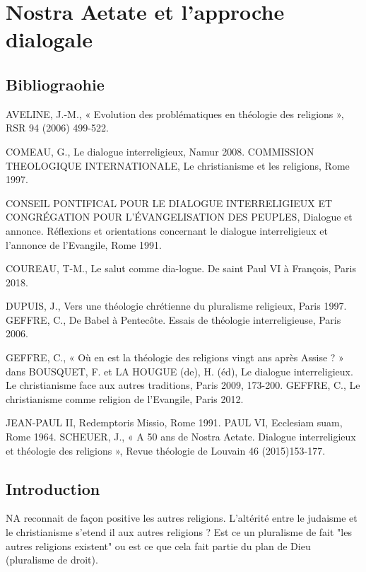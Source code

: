 \chapter{Nostra Aetate et l’approche dialogale}


\section{Bibliograohie}
 AVELINE, J.-M., « Evolution des problématiques en théologie des religions », RSR 94 (2006) 499-522. 
 
 COMEAU, G., Le dialogue interreligieux, Namur 2008. COMMISSION THEOLOGIQUE INTERNATIONALE, Le christianisme et les religions, Rome 1997.
 
 CONSEIL PONTIFICAL POUR LE DIALOGUE INTERRELIGIEUX ET CONGRÉGATION POUR L’ÉVANGELISATION DES PEUPLES, Dialogue et annonce. Réflexions et orientations concernant le dialogue interreligieux et l’annonce de l’Evangile, Rome 1991. 
 
 COUREAU, T-M., Le salut comme dia-logue. De saint Paul VI à François, Paris 2018. 
 
 DUPUIS, J., Vers une théologie chrétienne du pluralisme religieux, Paris 1997. GEFFRE, C., De Babel à Pentecôte. Essais de théologie interreligieuse, Paris 2006. 
 
 GEFFRE, C., « Où en est la théologie des religions vingt ans après Assise ? » dans BOUSQUET, F. et LA HOUGUE (de), H. (éd), Le dialogue interreligieux. Le christianisme face aux autres traditions, Paris 2009, 173-200. GEFFRE, C., Le christianisme comme religion de l’Evangile, Paris 2012. 
 
 JEAN-PAUL II, Redemptoris Missio, Rome 1991. PAUL VI, Ecclesiam suam, Rome 1964. SCHEUER, J., « A 50 ans de Nostra Aetate. Dialogue interreligieux et théologie des religions », Revue théologie de Louvain 46 (2015)153-177.
 
 
 
 
 \section{Introduction}
 
 NA reconnait de façon positive les autres religions. 
 L'altérité entre le judaisme et le christianisme  s'etend il aux autres religions ?
 Est ce un pluralisme de fait "les autres religions existent" ou est ce que cela fait partie du plan de Dieu (pluralisme de droit).
 
